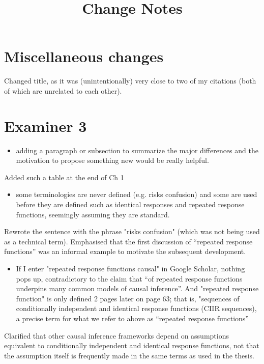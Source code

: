 \title{Change Notes}

\section{Miscellaneous changes}

Changed title, as it was (unintentionally) very close to two of my citations (both of which are unrelated to each other).

\section{Examiner 3}
\begin{itemize}
    \item adding a paragraph or subsection to summarize the major differences and the motivation to propose something new would be really helpful.
\end{itemize}

Added such a table at the end of Ch 1

\begin{itemize}
    \item some terminologies are never defined (e.g. risks confusion) and some are used before they are defined such as identical responses and repeated response functions, seemingly assuming they are standard.
\end{itemize}


Rewrote the sentence with the phrase "risks confusion" (which was not being used as a technical term). Emphasised that the first discussion of ``repeated response functions'' was an informal example to motivate the subsequent development.

\begin{itemize}
    \item If I enter "repeated response functions causal" in Google Scholar, nothing pops up, contradictory to the claim that “of repeated response functions underpins many common models of causal inference”. And "repeated response function" is only defined 2 pages later on page 63; that is, "sequences of conditionally independent and identical response functions (CIIR sequences), a precise term for what we refer to above as “repeated response functions”
\end{itemize}

Clarified that other causal inference frameworks depend on assumptions equivalent to conditionally independent and identical response functions, not that the assumption itself is frequently made in the same terms as used in the thesis.

